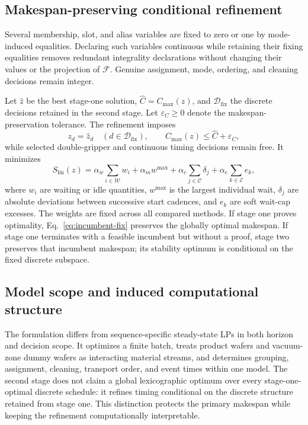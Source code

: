 \documentclass[preprint,12pt,authoryear]{elsarticle}
\newcommand{\cmax}{C_{\max}}
\begin{document}
\subsection{Makespan-preserving conditional refinement}

Several membership, slot, and alias variables are fixed to zero or one by
mode-induced equalities. Declaring such variables continuous while retaining
their fixing equalities removes redundant integrality declarations without
changing their values or the projection of $\mathcal F$. Genuine assignment,
mode, ordering, and cleaning decisions remain integer.

Let $\widehat z$ be the best stage-one solution,
$\widehat C=\cmax(\widehat z)$, and
$\mathcal D_{\mathrm{fix}}$ the discrete decisions retained in the second
stage. Let $\varepsilon_C\ge 0$ denote the makespan-preservation tolerance.
The refinement imposes
\begin{equation}
 z_d=\widehat z_d\quad(d\in\mathcal D_{\mathrm{fix}}),\qquad
 \cmax(z)\le\widehat C+\varepsilon_C,
 \label{eq:incumbent-fix}
\end{equation}
while selected double-gripper and continuous timing decisions remain free.
It minimizes
\begin{equation}
 S_{\mathrm{lin}}(z)=
 \alpha_w\sum_{i\in\mathcal W}w_i+
 \alpha_m w^{\max}+
 \alpha_c\sum_{j\in\mathcal C}\delta_j+
 \alpha_e\sum_{k\in\mathcal E}e_k,
 \label{eq:stability}
\end{equation}
where $w_i$ are waiting or idle quantities, $w^{\max}$ is the largest
individual wait, $\delta_j$ are absolute deviations between successive start
cadences, and $e_k$ are soft wait-cap excesses. The weights are fixed across
all compared methods. If stage one proves optimality, Eq.~\eqref{eq:incumbent-fix}
preserves the globally optimal makespan. If stage one terminates with a
feasible incumbent but without a proof, stage two preserves that incumbent
makespan; its stability optimum is conditional on the fixed discrete
subspace.

\subsection{Model scope and induced computational structure}

The formulation differs from sequence-specific steady-state LPs in both
horizon and decision scope. It optimizes a finite batch, treats product wafers
and vacuum-zone dummy wafers as interacting material streams, and determines grouping,
assignment, cleaning, transport order, and event times within one model.
The second stage does not claim a global lexicographic optimum over every
stage-one-optimal discrete schedule: it refines timing conditional on the
discrete structure retained from stage one. This distinction protects the
primary makespan while keeping the refinement computationally interpretable.
\end{document}

